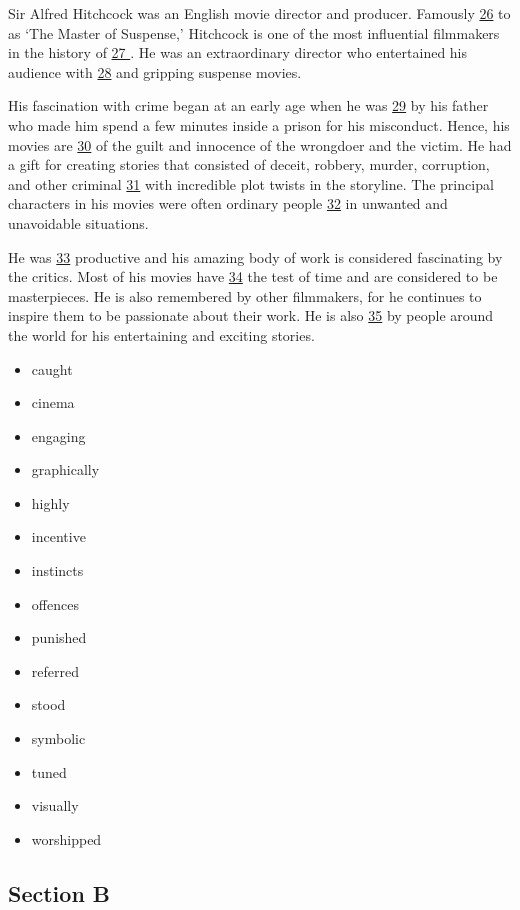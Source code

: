 \documentclass[UTF8,11pt]{ctexart}
\begin{document}
Sir Alfred Hitchcock was an English movie director and producer. Famously \uline{26} to as ‘The Master of Suspense,’ Hitchcock is one of the most influential filmmakers in the history of \uline{27 }. He was an extraordinary director who entertained his audience with \uline{28} and gripping suspense movies.


His fascination with crime began at an early age when he was \uline{29} by his father who made him spend a few minutes inside a prison for his misconduct. Hence, his movies are \uline{30} of the guilt and innocence of the wrongdoer and the victim. He had a gift for creating stories that consisted of deceit, robbery, murder, corruption, and other criminal \uline{31} with incredible plot twists in the storyline. The principal characters in his movies were often ordinary people \uline{32} in unwanted and unavoidable situations.


He was \uline{33} productive and his amazing body of work is considered fascinating by the critics. Most of his movies have \uline{34} the test of time and are considered to be masterpieces. He is also remembered by other filmmakers, for he continues to inspire them to be passionate about their work. He is also \uline{35} by people around the world for his entertaining and exciting stories.


\begin{itemize}[leftmargin=2em,itemsep=.2em,topsep=.4em]\item[A.] caught
\item[B.] cinema
\item[C.] engaging
\item[D.] graphically
\item[E.] highly
\item[F.] incentive
\item[G.] instincts
\item[H.] offences
\item[I.] punished
\item[J.] referred
\item[K.] stood
\item[L.] symbolic
\item[M.] tuned
\item[N.] visually
\item[O.] worshipped
\end{itemize}

\subsection*{\textbf{Section B}}
\end{document}
